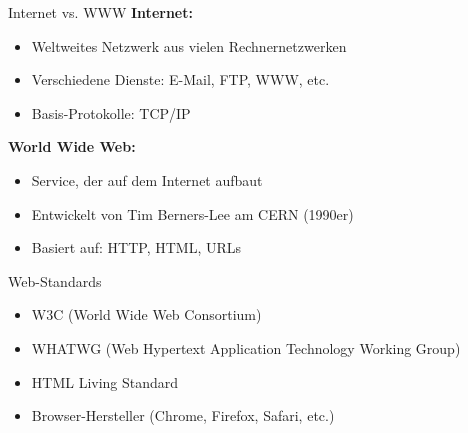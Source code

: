 \begin{concept}{Internet vs. WWW}
    \textbf{Internet:}
    \begin{itemize}
        \item Weltweites Netzwerk aus vielen Rechnernetzwerken
        \item Verschiedene Dienste: E-Mail, FTP, WWW, etc.
        \item Basis-Protokolle: TCP/IP
    \end{itemize}
    
    \textbf{World Wide Web:}
    \begin{itemize}
        \item Service, der auf dem Internet aufbaut
        \item Entwickelt von Tim Berners-Lee am CERN (1990er)
        \item Basiert auf: HTTP, HTML, URLs
    \end{itemize}
\end{concept}

\begin{concept}{Web-Standards}
    \begin{itemize}
        \item W3C (World Wide Web Consortium)
        \item WHATWG (Web Hypertext Application Technology Working Group)
        \item HTML Living Standard
        \item Browser-Hersteller (Chrome, Firefox, Safari, etc.)
    \end{itemize}
\end{concept}